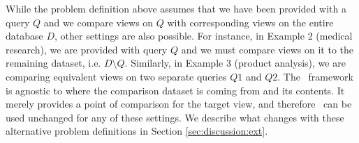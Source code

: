While the problem definition above
assumes that we have been provided with a query $Q$ and we compare views on $Q$
with corresponding views on the entire database $D$, other settings are also
possible. For instance, in Example 2 (medical research), we are provided with
query $Q$ and we must compare views on it to the remaining dataset, i.e.
$D$$\setminus$$Q$. Similarly, in Example 3 (product analysis), we are comparing
equivalent views on two separate queries $Q1$ and $Q2$. The \SeeDB\ framework is
agnostic to where the comparison dataset is coming from and its contents. It
merely provides a point of comparison for the target view, and therefore \SeeDB\
can be used unchanged for any of these settings.
We describe what changes with these alternative problem definitions in Section \ref{sec:discussion:ext}.





